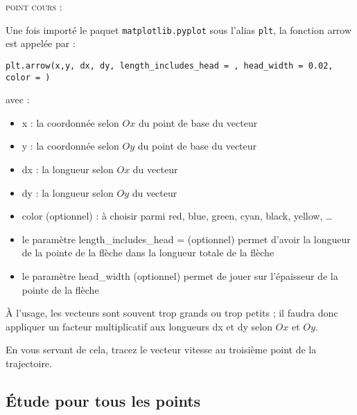 \documentclass[11pt]{article}
\begin{document}
\begin{enumerate}
{\begin{minipage}{0.8\textwidth}
 \textsc{point cours : }
 
 \smallskip
 Une fois importé le paquet \texttt{matplotlib.pyplot} sous l'alias \texttt{plt}, la fonction arrow est appelée par : 
 
 \smallskip
 \texttt{plt.arrow(x,y, dx, dy, length\_includes\_head = , head\_width = 0.02, color = )}
 
 \medskip
 avec : 
 
 \begin{itemize}
  \item x : la coordonnée selon $Ox$ du point de base du vecteur
  \item y : la coordonnée selon $Oy$ du point de base du vecteur
  \item dx : la longueur selon $Ox$ du vecteur
 \item dy : la longueur selon $Oy$ du vecteur
  \item color (optionnel) : à choisir parmi red, blue, green, cyan, black, yellow, \ldots
  \item le paramètre length\_includes\_head =  (optionnel) permet d'avoir la longueur de la pointe de la flèche dans la longueur totale de la flèche
  \item le paramètre head\_width (optionnel) permet de jouer sur l'épaisseur de la pointe de la flèche
 \end{itemize}

 \medskip
 À l'usage, les vecteurs sont souvent trop grands ou trop petits ; il faudra donc appliquer un facteur multiplicatif aux longueurs dx et dy selon $Ox$ et $Oy$.
 \end{minipage}}
 
 
 \medskip
 En vous servant de cela, tracez le vecteur vitesse au troisième point de la trajectoire. 
 
 \end{enumerate}
 
 
 \subsection{Étude pour tous les points}
 
\end{document}
